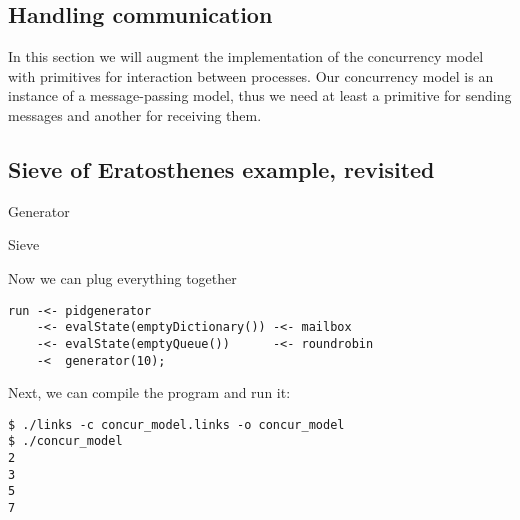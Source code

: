 \documentclass[12pt,mscres,cdtppar,twoside,openright,logo,rightchapter,normalheadings]{infthesis}
\newcommand{\snippet}[1]{}
\theoremstyle{definition}
\begin{document}
\subsection{Handling communication}
\label{sec:links-model-handlers-communication}

In this section we will augment the implementation of the concurrency
model with primitives for interaction between processes. Our
concurrency model is an instance of a message-passing model, thus we
need at least a primitive for sending messages and another for
receiving them.

\subsection{Sieve of Eratosthenes example, revisited}
\label{sec:links-model-handlers-example}

Generator
%
\snippet{generator.links}
%
Sieve
%
\snippet{sieve.links}
%
Now we can plug everything together
%
\begin{lstlisting}
run -<- pidgenerator
    -<- evalState(emptyDictionary()) -<- mailbox 
    -<- evalState(emptyQueue())      -<- roundrobin 
    -<  generator(10);
\end{lstlisting}
Next, we can compile the program and run it:
\begin{lstlisting}
$ ./links -c concur_model.links -o concur_model
$ ./concur_model
2
3
5
7
\end{lstlisting}
\end{document}
